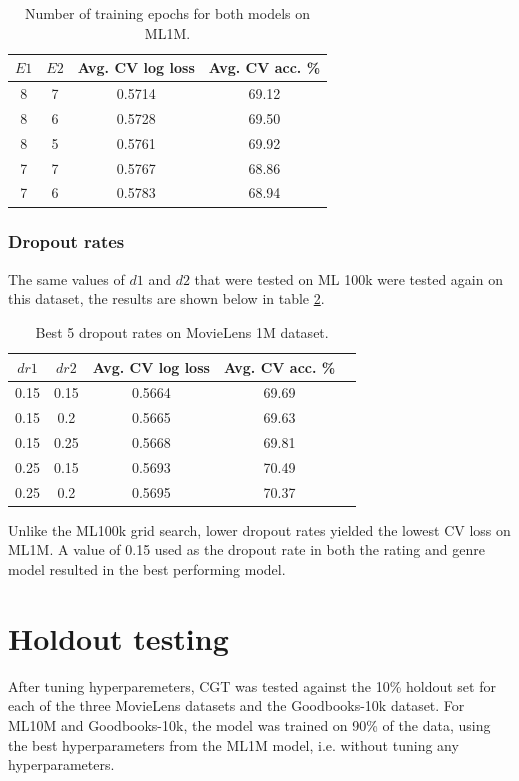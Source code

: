 \begin{table}[H]
\centering
\begin{tabular}{c | c | c | c}
\toprule
\textbf{$E1$} & \textbf{$E2$} & \textbf{Avg. CV log loss} & \textbf{Avg. CV acc.} \% \\
\midrule
8 & 7 & 0.5714 & 69.12 \\
\midrule
8 & 6 & 0.5728 & 69.50 \\
\midrule
8 & 5 & 0.5761 & 69.92 \\
\midrule
7 & 7 & 0.5767 & 68.86 \\
\midrule
7 & 6 & 0.5783 & 68.94 \\
\bottomrule
\end{tabular}
\caption[MovieLens 1M grid search results -- number of epochs]{Number of training epochs for both models on ML1M.}
\label{tab:ml1m-grid-results2}
\end{table}

\subsubsection{Dropout rates}
The same values of $d1$ and $d2$ that were tested on ML 100k were tested again on this dataset, the results are shown below in table \ref{tab:ml1m-grid-results3}.

\begin{table}[H]
\centering
\begin{tabular}{c | c | c | c | c}
\toprule
\textbf{$dr1$} & \textbf{$dr2$} & \textbf{Avg. CV log loss} & \textbf{Avg. CV acc.} \% \\
\midrule
0.15 & 0.15 & 0.5664 & 69.69 \\
\midrule
0.15 & 0.2 & 0.5665 & 69.63 \\
\midrule
0.15 & 0.25 & 0.5668 & 69.81 \\
\midrule
0.25 & 0.15 & 0.5693 & 70.49 \\
\midrule
0.25 & 0.2 & 0.5695 & 70.37 \\
\bottomrule
\end{tabular}
\caption[MovieLens 1M grid search results -- dropout rates]{Best 5 dropout rates on MovieLens 1M dataset.}
\label{tab:ml1m-grid-results3}
\end{table}

Unlike the ML100k grid search, lower dropout rates yielded the lowest CV loss on ML1M. A value of 0.15 used as the dropout rate in both the rating and genre model resulted in the best performing model.

\section{Holdout testing}
After tuning hyperparemeters, CGT was tested against the 10\% holdout set for each of the three MovieLens datasets and the Goodbooks-10k dataset. For ML10M and Goodbooks-10k, the model was trained on 90\% of the data, using the best hyperparameters from the ML1M model, i.e. without tuning any hyperparameters.

